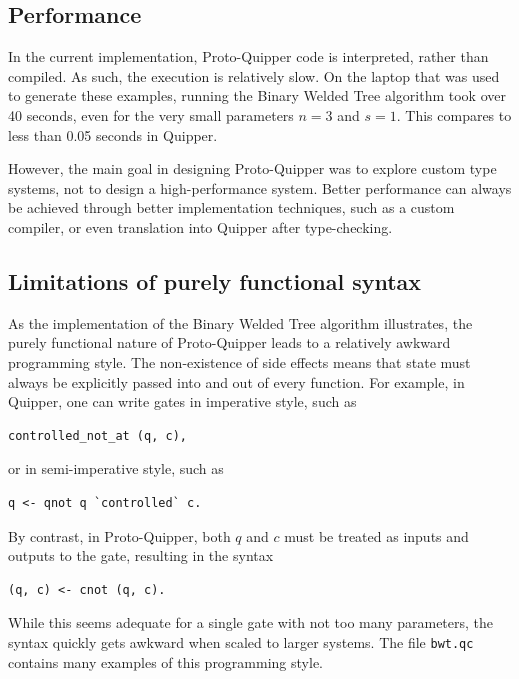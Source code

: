 \documentclass[twoside]{article}
\begin{document}
\subsection{Performance}

In the current implementation, Proto-Quipper code is interpreted,
rather than compiled. As such, the execution is relatively slow.  On
the laptop that was used to generate these examples, running the
Binary Welded Tree algorithm took over 40 seconds, even for the very
small parameters $n=3$ and $s=1$. This compares to less than 0.05
seconds in Quipper.

However, the main goal in designing Proto-Quipper was to explore
custom type systems, not to design a high-performance system. Better
performance can always be achieved through better implementation
techniques, such as a custom compiler, or even translation into
Quipper after type-checking.

\subsection{Limitations of purely functional syntax}

As the implementation of the Binary Welded Tree algorithm illustrates,
the purely functional nature of Proto-Quipper leads to a relatively
awkward programming style. The non-existence of side effects means
that state must always be explicitly passed into and out of every
function. For example, in Quipper, one can write gates in imperative
style, such as
\begin{code}
\begin{verbatim}
controlled_not_at (q, c),
\end{verbatim}
\end{code}
\noindent or in semi-imperative style, such as
\begin{code}
\begin{verbatim}
q <- qnot q `controlled` c.
\end{verbatim}
\end{code}
\noindent By contrast, in Proto-Quipper, both $q$ and $c$ must be treated as
inputs and outputs to the gate, resulting in the syntax
\begin{code}
\begin{verbatim}
(q, c) <- cnot (q, c).
\end{verbatim}
\end{code}
\noindent While this seems adequate for a single gate with not too many
parameters, the syntax quickly gets awkward when scaled to larger
systems. The file \verb!bwt.qc! contains many examples of this
programming style. 
\end{document}
